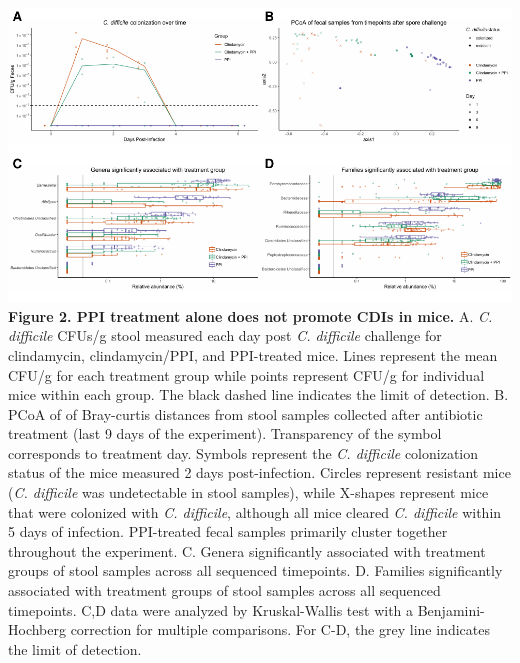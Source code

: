 \documentclass[11pt,]{article}
\begin{document}
\newpage

\includegraphics{figure_2.pdf} \textbf{Figure 2. PPI treatment alone
does not promote CDIs in mice.} A. \emph{C. difficile} CFUs/g stool
measured each day post \emph{C. difficile} challenge for clindamycin,
clindamycin/PPI, and PPI-treated mice. Lines represent the mean CFU/g
for each treatment group while points represent CFU/g for individual
mice within each group. The black dashed line indicates the limit of
detection. B. PCoA of of Bray-curtis distances from stool samples
collected after antibiotic treatment (last 9 days of the experiment).
Transparency of the symbol corresponds to treatment day. Symbols
represent the \emph{C. difficile} colonization status of the mice
measured 2 days post-infection. Circles represent resistant mice
(\emph{C. difficile} was undetectable in stool samples), while X-shapes
represent mice that were colonized with \emph{C. difficile}, although
all mice cleared \emph{C. difficile} within 5 days of infection.
PPI-treated fecal samples primarily cluster together throughout the
experiment. C. Genera significantly associated with treatment groups of
stool samples across all sequenced timepoints. D. Families significantly
associated with treatment groups of stool samples across all sequenced
timepoints. C,D data were analyzed by Kruskal-Wallis test with a
Benjamini-Hochberg correction for multiple comparisons. For C-D, the
grey line indicates the limit of detection.

\newpage
\end{document}
